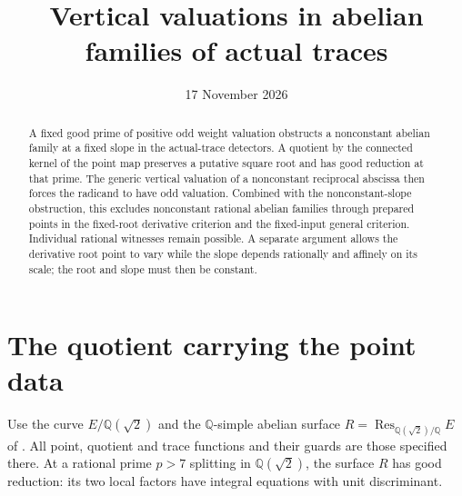 \documentclass[11pt,a4paper]{article}
\title{Vertical valuations in abelian families of actual traces}
\author{}\date{17 November 2026}
\newcommand{\Q}{\mathbb Q}
\begin{document}
\maketitle
\begin{abstract}
A fixed good prime of positive odd weight valuation obstructs a
nonconstant abelian family at a fixed slope in the actual-trace
detectors. A quotient by the connected kernel of the point map
preserves a putative square root and has good reduction at that prime.
The generic vertical valuation of a nonconstant reciprocal abscissa
then forces the radicand to have odd valuation. Combined with the
nonconstant-slope obstruction, this excludes nonconstant rational
abelian families through prepared points in the fixed-root derivative
criterion and the fixed-input general criterion. Individual rational
witnesses remain possible. A separate argument allows the derivative
root point to vary while the slope depends rationally and affinely on
its scale; the root and slope must then be constant.
\end{abstract}

\section{The quotient carrying the point data}

Use the curve $E/\Q(\sqrt2)$ and the $\Q$-simple abelian surface
$R=\operatorname{Res}_{\Q(\sqrt2)/\Q}E$ of \cite{Families}.
All point, quotient and trace functions and their guards are those
specified there. At a rational prime $p>7$ splitting in
$\Q(\sqrt2)$, the surface $R$ has good reduction: its two
local factors have integral equations with unit discriminant.
\end{document}
